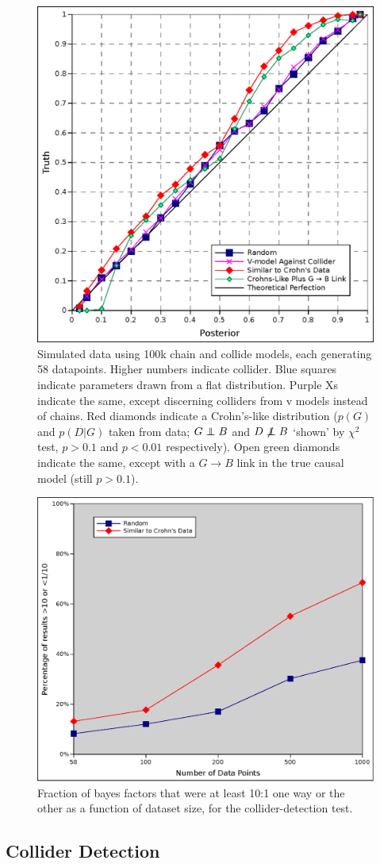 \documentclass[letterpaper]{article}
\newcommand\indep{\protect\mathpalette{\protect\independenT}{\perp}}
\def\independenT#1#2{\mathrel{\rlap{$#1#2$}\mkern2mu{#1#2}}}
\begin{document}
\begin{figure}
  \includegraphics[width=.5\textwidth]{test_direction_uni}
  \caption{Simulated data using 100k chain and collide models, each
    generating 58 datapoints.
    Higher numbers indicate collider.  Blue squares indicate
    parameters drawn from a flat distribution.  Purple Xs indicate the
    same, except discerning colliders from v models instead of
    chains. Red diamonds indicate a
    Crohn's-like distribution ($p(G)$ and $p(D|G)$ taken from
    data; $G\indep B$ and $D\not\indep B$ `shown' by $\chi^2$ test,
    $p>0.1$ and $p<0.01$ respectively).  Open green diamonds indicate
    the same, except with a $G\rightarrow B$ link in the true causal
    model (still $p>0.1$).}
  
  \label{dir_pla58}
\end{figure}

\begin{figure}
  \includegraphics[width=.5\textwidth]{usefullness}
  \caption{Fraction of bayes factors that were at least 10:1 one way
    or the other as a function of dataset size, for the
    collider-detection test.}
  \label{dir_use}
\end{figure}

\subsection{Collider Detection}
\end{document}
